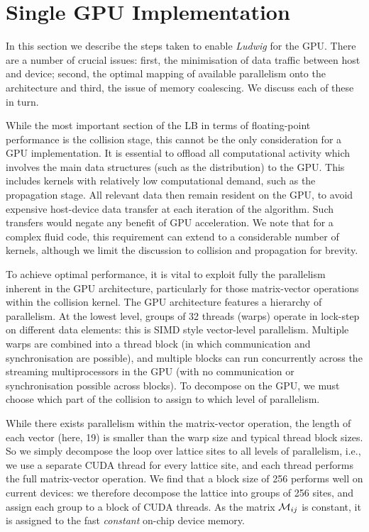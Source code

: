 \section{Single GPU Implementation}\label{ch14:sec:singlegpu} 


In this section we describe the steps taken to enable \textit{Ludwig}
for the GPU. There are a number of crucial issues: first, the
minimisation of data traffic between host and device; second, the
optimal mapping of available parallelism onto the architecture and
third, the issue of memory coalescing. We discuss each of these in
turn.

While the most important section of the LB in terms of
floating-point performance is the collision stage, this cannot be the
only consideration for a GPU implementation. It is essential to
offload all computational activity which involves the main data
structures (such as the distribution) to the GPU. This includes
kernels with relatively low computational demand, such as the
propagation stage. All relevant data then remain resident on the GPU,
to avoid expensive host-device data transfer at each iteration of
the algorithm. Such transfers would negate any benefit of GPU
acceleration.  We note that for a complex fluid code, this requirement
can extend to a considerable number of kernels, although we limit the
discussion to collision and propagation for brevity.

To achieve optimal performance, it is vital to exploit fully the
parallelism inherent in the GPU architecture, particularly for
those matrix-vector operations within the collision kernel.
The GPU architecture features a hierarchy of parallelism. At the
lowest level, groups of 32 threads (warps) operate in
lock-step on different data elements: this is SIMD style vector-level
parallelism. Multiple warps are combined into a thread block (in which
communication and synchronisation are possible), and multiple blocks can
run concurrently across the streaming multiprocessors in the GPU
(with no communication or
synchronisation possible across blocks).  To decompose on the GPU, we
must choose which part of the collision to assign to which level of
parallelism.

While there exists parallelism within the matrix-vector operation, the
length of each vector (here, 19) is smaller than the warp size and typical
thread block sizes. So we simply decompose the loop over lattice sites
to all levels of parallelism, i.e., we use a separate CUDA thread for
every lattice site, and each thread performs the full matrix-vector
operation. We find that a block size of 256 performs well on current
devices: we therefore decompose
the lattice into groups of 256 sites, and assign each group to a block
of CUDA threads. As the matrix ${\cal M}_{ij}$ is constant, it is
assigned to the fast {\it constant} on-chip device memory.

